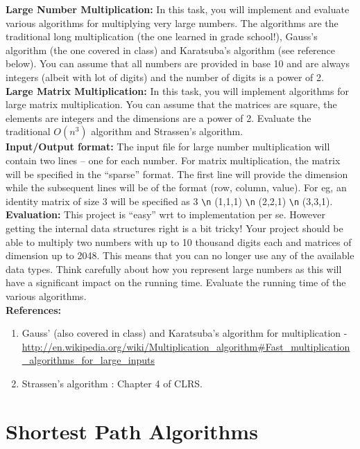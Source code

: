 \documentclass[12pt]{article}
\newcommand*{\escape}[1]{\texttt{\textbackslash#1}}
\begin{document}
{\bf Large Number Multiplication:} In this task, you will implement and evaluate various algorithms for multiplying very large numbers. The algorithms are the traditional long multiplication (the one learned in grade school!), Gauss's algorithm (the one covered in class) and Karatsuba's algorithm (see reference below). You can assume that all numbers are provided in base 10 and are always integers (albeit with lot of digits) and the number of digits is a power of 2. \\

{\bf Large Matrix Multiplication:} In this task, you will implement algorithms for large matrix multiplication. You can assume that the matrices are square, the elements are integers and the dimensions are a power of 2. Evaluate the traditional $O(n^3)$ algorithm and Strassen's algorithm. \\

{\bf Input/Output format:} The input file for large number multiplication will contain two lines – one for each number. For matrix multiplication, the matrix will be specified in the ``sparse'' format. The first line will provide the dimension while the subsequent lines will be of the format (row, column, value). For eg, an identity matrix of size 3 will be specified as 3 \escape{n} (1,1,1) \escape{n} (2,2,1) \escape{n} (3,3,1). \\

{\bf Evaluation:} This project is ``easy'' wrt to implementation per se. However  getting the internal data structures right is a bit tricky! Your project should be able to multiply two numbers with up to 10 thousand digits each and matrices of dimension up to 2048. This means that you can no longer use any of the available data types. Think carefully about how you represent large numbers as this will have a significant impact on the running time. 
Evaluate the running time of the various algorithms.  \\

{\bf References:}
\begin{enumerate}
\item Gauss' (also covered in class) and Karatsuba's algorithm for  multiplication  - \url{http://en.wikipedia.org/wiki/Multiplication_algorithm#Fast_multiplication_algorithms_for_large_inputs}
\item Strassen's algorithm : Chapter 4 of CLRS.
\end{enumerate}


\section{Shortest Path Algorithms}
\end{document}
